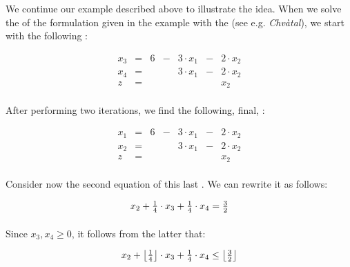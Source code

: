 \begin{example}
We continue our example described above to illustrate the idea. When we solve the  of the formulation given in the example with the  (see e.g. \emph{Chv\`atal}\cite{Chvatal/83/Linear}), we start with the following :

\begin{equation}
\begin{array}{rcrcrcr}
x_3&=&6&-&3\cdot x_1&-&2\cdot x_2\\
x_4&=&&&3\cdot x_1&-&2\cdot x_2\\\hline
z&=&&&&&x_2
\end{array}
\end{equation}

\paragraph{}
After performing two iterations, we find the following, final, :

\begin{equation}
\begin{array}{rcrcrcr}
x_1&=&6&-&3\cdot x_1&-&2\cdot x_2\\
x_2&=&&&3\cdot x_1&-&2\cdot x_2\\\hline
z&=&&&&&x_2
\end{array}
\end{equation}

\paragraph{}
Consider now the second equation of this last . We can rewrite it as follows:

\begin{equation}
x_2+\tfrac{1}{4}\cdot x_3+\tfrac{1}{4}\cdot x_4=\tfrac{3}{2}\eqnlab{cg-cut-eq2-ini}
\end{equation}

\paragraph{}
Since $x_3,x_4\geq 0$, it follows from the latter  that:

\begin{equation}
x_2+\left\lfloor \tfrac{1}{4} \right\rfloor\cdot x_3+\tfrac{1}{4}\cdot x_4\leq\left\lfloor \tfrac{3}{2} \right\rfloor
\end{equation}


\end{example}
